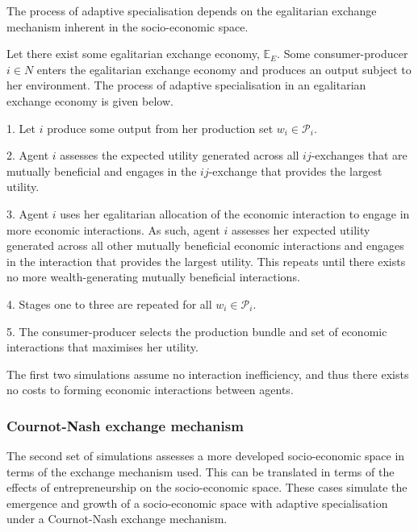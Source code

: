 The process of adaptive specialisation depends on the egalitarian exchange mechanism inherent in the socio-economic space.

\begin{algorithm}
Let there exist some egalitarian exchange economy, $\mathbb{E}_{E}$. Some consumer-producer $i \in N$ enters the egalitarian exchange economy and produces an output subject to her environment. The process of adaptive specialisation in an egalitarian exchange economy is given below.
\begin{abet}
	\item[1.] Let $i$ produce some output from her production set $w_{i} \in \mathcal{P}_{i}$.

	\item[2.] Agent $i$ assesses the expected utility generated across all $ij$-exchanges that are mutually beneficial and engages in the $ij$-exchange that provides the largest utility.

	\item[3.] Agent $i$ uses her egalitarian allocation of the economic interaction to engage in more economic interactions. As such, agent $i$ assesses her expected utility generated across all other mutually beneficial economic interactions and engages in the interaction that provides the largest utility. This repeats until there exists no more wealth-generating mutually beneficial interactions.

	\item[4.] Stages one to three are repeated for all $w_{i} \in \mathcal{P}_{i}$.

	\item[5.] The consumer-producer selects the production bundle and set of economic interactions that maximises her utility.
\end{abet}
\end{algorithm}

The first two simulations assume no interaction inefficiency, and thus there exists no costs to forming economic interactions between agents.

\subsubsection{Cournot-Nash exchange mechanism}

The second set of simulations assesses a more developed socio-economic space in terms of the exchange mechanism used. This can be translated in terms of the effects of entrepreneurship on the socio-economic space. These cases simulate the emergence and growth of a socio-economic space with adaptive specialisation under a Cournot-Nash exchange mechanism.

